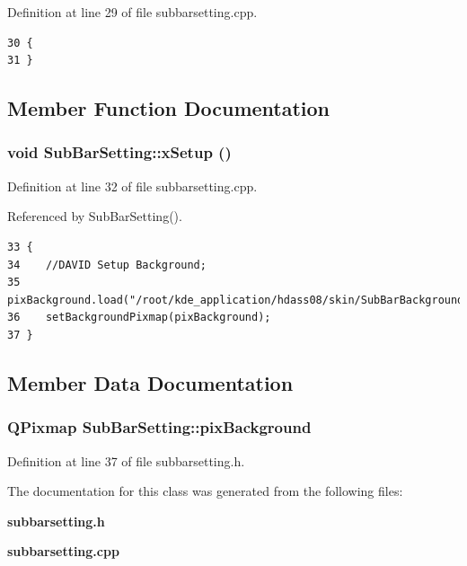 Definition at line 29 of file subbarsetting.cpp.



\footnotesize\begin{verbatim}30 {
31 }
\end{verbatim}\normalsize 


\subsection{Member Function Documentation}
\subsubsection{\setlength{\rightskip}{0pt plus 5cm}void Sub\-Bar\-Setting::x\-Setup ()}\label{classSubBarSetting_SubBarSettinga2}




Definition at line 32 of file subbarsetting.cpp.

Referenced by Sub\-Bar\-Setting().



\footnotesize\begin{verbatim}33 {
34    //DAVID Setup Background;
35    pixBackground.load("/root/kde_application/hdass08/skin/SubBarBackground.png");
36    setBackgroundPixmap(pixBackground);
37 }
\end{verbatim}\normalsize 


\subsection{Member Data Documentation}
\subsubsection{\setlength{\rightskip}{0pt plus 5cm}QPixmap {\bf Sub\-Bar\-Setting::pix\-Background}\hspace{0.3cm}{\tt  [private]}}\label{classSubBarSetting_SubBarSettingr0}




Definition at line 37 of file subbarsetting.h.

The documentation for this class was generated from the following files:\begin{CompactItemize}
\item 
{\bf subbarsetting.h}\item 
{\bf subbarsetting.cpp}\end{CompactItemize}
